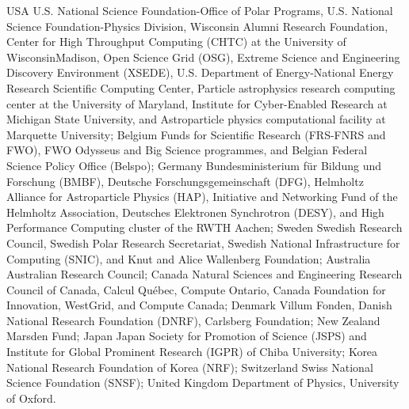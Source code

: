 USA {\textendash} U.S. National Science Foundation-Office of Polar Programs,
U.S. National Science Foundation-Physics Division,
Wisconsin Alumni Research Foundation,
Center for High Throughput Computing (CHTC) at the University of Wisconsin{\textendash}Madison,
Open Science Grid (OSG),
Extreme Science and Engineering Discovery Environment (XSEDE),
U.S. Department of Energy-National Energy Research Scientific Computing Center,
Particle astrophysics research computing center at the University of Maryland,
Institute for Cyber-Enabled Research at Michigan State University,
and Astroparticle physics computational facility at Marquette University;
Belgium {\textendash} Funds for Scientific Research (FRS-FNRS and FWO),
FWO Odysseus and Big Science programmes,
and Belgian Federal Science Policy Office (Belspo);
Germany {\textendash} Bundesministerium f{\"u}r Bildung und Forschung (BMBF),
Deutsche Forschungsgemeinschaft (DFG),
Helmholtz Alliance for Astroparticle Physics (HAP),
Initiative and Networking Fund of the Helmholtz Association,
Deutsches Elektronen Synchrotron (DESY),
and High Performance Computing cluster of the RWTH Aachen;
Sweden {\textendash} Swedish Research Council,
Swedish Polar Research Secretariat,
Swedish National Infrastructure for Computing (SNIC),
and Knut and Alice Wallenberg Foundation;
Australia {\textendash} Australian Research Council;
Canada {\textendash} Natural Sciences and Engineering Research Council of Canada,
Calcul Qu{\'e}bec, Compute Ontario, Canada Foundation for Innovation, WestGrid, and Compute Canada;
Denmark {\textendash} Villum Fonden, Danish National Research Foundation (DNRF), Carlsberg Foundation;
New Zealand {\textendash} Marsden Fund;
Japan {\textendash} Japan Society for Promotion of Science (JSPS)
and Institute for Global Prominent Research (IGPR) of Chiba University;
Korea {\textendash} National Research Foundation of Korea (NRF);
Switzerland {\textendash} Swiss National Science Foundation (SNSF);
United Kingdom {\textendash} Department of Physics, University of Oxford.